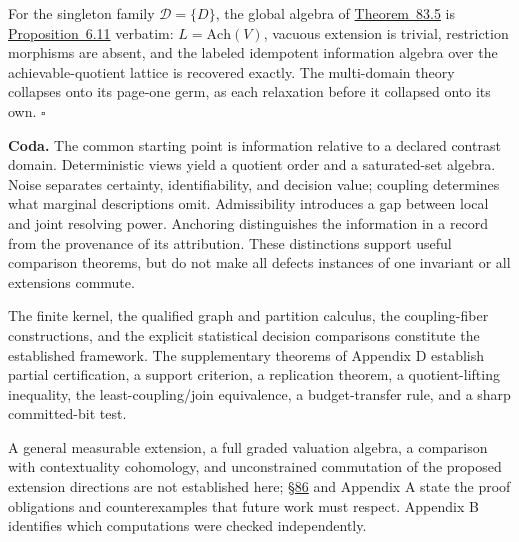 \begin{thmplain}

For the singleton family \(\mathcal{D} = \{D\}\), the global algebra of \hyperlink{stmt:83.5}{Theorem~83.5} is \hyperlink{stmt:6.11}{Proposition~6.11} verbatim: \(L = \mathrm{Ach}(V)\), vacuous extension is trivial, restriction morphisms are absent, and the labeled idempotent information algebra over the achievable-quotient lattice is recovered exactly. The multi-domain theory collapses onto its page-one germ, as each relaxation before it collapsed onto its own. \(\square\)
\end{thmplain}

\textbf{Coda.} The common starting point is information relative to a declared contrast domain. Deterministic views yield a quotient order and a saturated-set algebra. Noise separates certainty, identifiability, and decision value; coupling determines what marginal descriptions omit. Admissibility introduces a gap between local and joint resolving power. Anchoring distinguishes the information in a record from the provenance of its attribution. These distinctions support useful comparison theorems, but do not make all defects instances of one invariant or all extensions commute.


The finite kernel, the qualified graph and partition calculus, the coupling-fiber constructions, and the explicit statistical decision comparisons constitute the established framework. The supplementary theorems of Appendix D establish partial certification, a support criterion, a replication theorem, a quotient-lifting inequality, the least-coupling/join equivalence, a budget-transfer rule, and a sharp committed-bit test.

A general measurable extension, a full graded valuation algebra, a comparison with contextuality cohomology, and unconstrained commutation of the proposed extension directions are not established here; \hyperlink{sec:86}{§86} and Appendix A state the proof obligations and counterexamples that future work must respect. Appendix B identifies which computations were checked independently.
